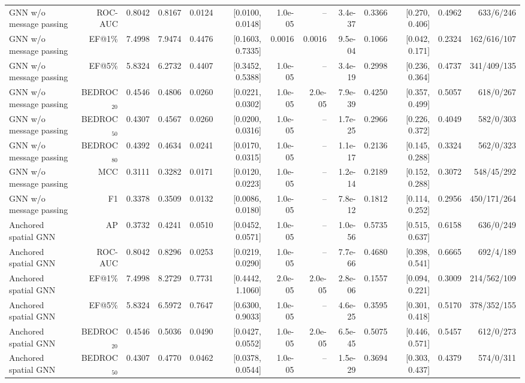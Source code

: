 \begin{table}[t]
\begin{tabular}{lrrrrrrrrrrrr}
GNN w/o message passing & ROC-AUC & 0.8042 & 0.8167 & 0.0124 & [0.0100, 0.0148] & 1.0e-05 & -- & 3.4e-37 & 0.3366 & [0.270, 0.406] & 0.4962 & 633/6/246 \\
GNN w/o message passing & EF@1\% & 7.4998 & 7.9474 & 0.4476 & [0.1603, 0.7335] & 0.0016 & 0.0016 & 9.5e-04 & 0.1066 & [0.042, 0.171] & 0.2324 & 162/616/107 \\
GNN w/o message passing & EF@5\% & 5.8324 & 6.2732 & 0.4407 & [0.3452, 0.5388] & 1.0e-05 & -- & 3.4e-19 & 0.2998 & [0.236, 0.364] & 0.4737 & 341/409/135 \\
GNN w/o message passing & BEDROC$_{20}$ & 0.4546 & 0.4806 & 0.0260 & [0.0221, 0.0302] & 1.0e-05 & 2.0e-05 & 7.9e-39 & 0.4250 & [0.357, 0.499] & 0.5057 & 618/0/267 \\
GNN w/o message passing & BEDROC$_{50}$ & 0.4307 & 0.4567 & 0.0260 & [0.0200, 0.0316] & 1.0e-05 & -- & 1.7e-25 & 0.2966 & [0.226, 0.372] & 0.4049 & 582/0/303 \\
GNN w/o message passing & BEDROC$_{80}$ & 0.4392 & 0.4634 & 0.0241 & [0.0170, 0.0315] & 1.0e-05 & -- & 1.1e-17 & 0.2136 & [0.145, 0.288] & 0.3324 & 562/0/323 \\
GNN w/o message passing & MCC & 0.3111 & 0.3282 & 0.0171 & [0.0120, 0.0223] & 1.0e-05 & -- & 1.2e-14 & 0.2189 & [0.152, 0.288] & 0.3072 & 548/45/292 \\
GNN w/o message passing & F1 & 0.3378 & 0.3509 & 0.0132 & [0.0086, 0.0180] & 1.0e-05 & -- & 7.8e-12 & 0.1812 & [0.114, 0.252] & 0.2956 & 450/171/264 \\
Anchored spatial GNN & AP & 0.3732 & 0.4241 & 0.0510 & [0.0452, 0.0571] & 1.0e-05 & -- & 1.0e-56 & 0.5735 & [0.515, 0.637] & 0.6158 & 636/0/249 \\
Anchored spatial GNN & ROC-AUC & 0.8042 & 0.8296 & 0.0253 & [0.0219, 0.0290] & 1.0e-05 & -- & 7.7e-66 & 0.4680 & [0.398, 0.541] & 0.6665 & 692/4/189 \\
Anchored spatial GNN & EF@1\% & 7.4998 & 8.2729 & 0.7731 & [0.4442, 1.1060] & 2.0e-05 & 2.0e-05 & 2.8e-06 & 0.1557 & [0.094, 0.221] & 0.3009 & 214/562/109 \\
Anchored spatial GNN & EF@5\% & 5.8324 & 6.5972 & 0.7647 & [0.6300, 0.9033] & 1.0e-05 & -- & 4.6e-25 & 0.3595 & [0.301, 0.418] & 0.5170 & 378/352/155 \\
Anchored spatial GNN & BEDROC$_{20}$ & 0.4546 & 0.5036 & 0.0490 & [0.0427, 0.0552] & 1.0e-05 & 2.0e-05 & 6.5e-45 & 0.5075 & [0.446, 0.571] & 0.5457 & 612/0/273 \\
Anchored spatial GNN & BEDROC$_{50}$ & 0.4307 & 0.4770 & 0.0462 & [0.0378, 0.0544] & 1.0e-05 & -- & 1.5e-29 & 0.3694 & [0.303, 0.437] & 0.4379 & 574/0/311 \\

\end{tabular}
\end{table}
